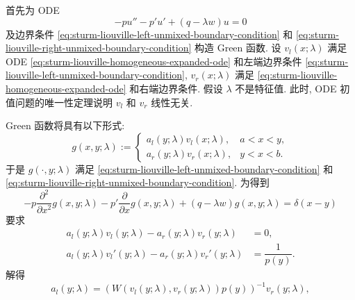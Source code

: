 \begin{Proof}
首先为 ODE
\begin{equation}\label{eq:sturm-liouville-homogeneous-expanded-ode}
-pu''-p'u'+(q-\lambda w)u=0
\end{equation}
及边界条件 \eqref{eq:sturm-liouville-left-unmixed-boundary-condition} 和 \eqref{eq:sturm-liouville-right-unmixed-boundary-condition} 构造 Green 函数. 设 $v_l(x;\lambda)$ 满足 ODE \eqref{eq:sturm-liouville-homogeneous-expanded-ode} 和左端边界条件 \eqref{eq:sturm-liouville-left-unmixed-boundary-condition}, $v_r(x;\lambda)$ 满足 \eqref{eq:sturm-liouville-homogeneous-expanded-ode} 和右端边界条件. 假设 $\lambda$ 不是特征值. 此时, ODE 初值问题的唯一性定理说明 $v_l$ 和 $v_r$ 线性无关.

Green 函数将具有以下形式:
\begin{equation}\label{eq:sturm-liouville-green-function-piecewise-ansatz}
g(x,y;\lambda):=\begin{cases}
a_l(y;\lambda)v_l(x;\lambda),&a<x<y,\\
a_r(y;\lambda)v_r(x;\lambda),&y<x<b.
\end{cases}
\end{equation}
于是 $g(\cdot,y;\lambda)$ 满足 \eqref{eq:sturm-liouville-left-unmixed-boundary-condition} 和 \eqref{eq:sturm-liouville-right-unmixed-boundary-condition}. 为得到
\begin{equation}\label{eq:sturm-liouville-green-function-delta-equation}
-p\frac{\partial^2}{\partial x^2}g(x,y;\lambda)-p'\frac{\partial}{\partial x}g(x,y;\lambda)+(q-\lambda w)g(x,y;\lambda)=\delta(x-y)
\end{equation}
要求\[\begin{aligned}
a_l(y;\lambda)v_l(y;\lambda)-a_r(y;\lambda)v_r(y;\lambda)&=0,\\
a_l(y;\lambda)v_l'(y;\lambda)-a_r(y;\lambda)v_r'(y;\lambda)&=\dfrac{1}{p(y)}.
\end{aligned}\]解得
\begin{equation}\label{eq:sturm-liouville-green-left-coefficient}
a_l(y;\lambda)=(W(v_l(y;\lambda),v_r(y;\lambda))p(y))^{-1}v_r(y;\lambda),
\end{equation}


\end{Proof}
